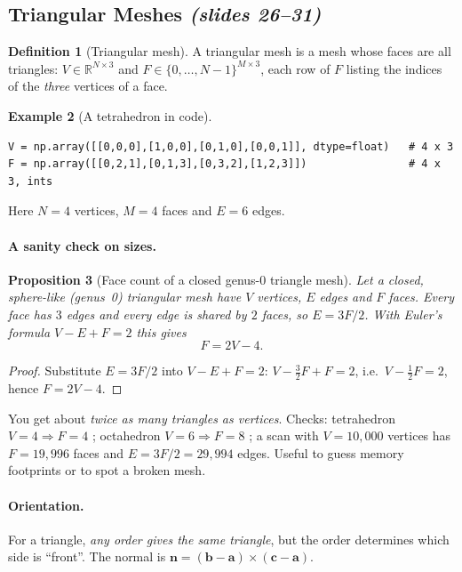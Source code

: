 \documentclass[11pt,a4paper]{article}
\newcommand{\R}{\mathbb{R}}
\newcommand{\vn}{\bm{n}}
\newcommand{\va}{\bm{a}}
\newcommand{\vb}{\bm{b}}
\newcommand{\vc}{\bm{c}}
\theoremstyle{definition}
\newtheorem{definition}{Definition}[section]
\newtheorem{example}[definition]{Example}
\theoremstyle{plain}
\newtheorem{proposition}[definition]{Proposition}
\theoremstyle{remark}
\newcommand{\slides}[1]{\texorpdfstring{\emph{(#1)}}{(#1)}}
\begin{document}
\subsection{Triangular Meshes \slides{slides 26--31}}
\begin{definition}[Triangular mesh]
A triangular mesh is a mesh whose faces are all triangles: $V\in\R^{N\times 3}$ and $F\in\{0,\dots,N-1\}^{M\times 3}$, each row of $F$ listing the indices of the \emph{three} vertices of a face.
\end{definition}

\begin{example}[A tetrahedron in code]
\begin{lstlisting}
V = np.array([[0,0,0],[1,0,0],[0,1,0],[0,0,1]], dtype=float)   # 4 x 3
F = np.array([[0,2,1],[0,1,3],[0,3,2],[1,2,3]])                # 4 x 3, ints
\end{lstlisting}
Here $N=4$ vertices, $M=4$ faces and $E=6$ edges.
\end{example}

\paragraph{A sanity check on sizes.}
\begin{proposition}[Face count of a closed genus-0 triangle mesh]\label{prop:euler}
Let a closed, sphere-like (genus~0) triangular mesh have $V$ vertices, $E$ edges and $F$ faces. Every face has $3$ edges and every edge is shared by $2$ faces, so $E=3F/2$. With Euler's formula $V-E+F=2$ this gives
\[
F=2V-4 .
\]
\end{proposition}
\begin{proof}
Substitute $E=3F/2$ into $V-E+F=2$: $V-\tfrac32F+F=2$, i.e.\ $V-\tfrac12F=2$, hence $F=2V-4$.
\end{proof}

\begin{intuition}
You get about \emph{twice as many triangles as vertices}. Checks: tetrahedron $V=4\Rightarrow F=4$ \checkmark; octahedron $V=6\Rightarrow F=8$ \checkmark; a scan with $V=10{,}000$ vertices has $F=19{,}996$ faces and $E=3F/2=29{,}994$ edges. Useful to guess memory footprints or to spot a broken mesh.
\end{intuition}

\paragraph{Orientation.} For a triangle, \emph{any order gives the same triangle}, but the order determines which side is ``front''. The normal is $\vn=(\vb-\va)\times(\vc-\va)$.
\end{document}

